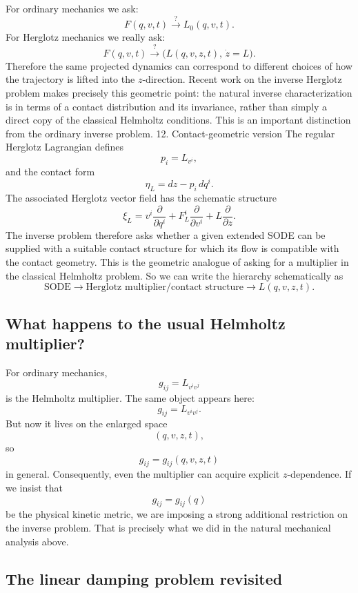 For ordinary mechanics we ask:
$$ F(q,v,t) \stackrel{?}{\longrightarrow} L_0(q,v,t). $$
For Herglotz mechanics we really ask:
$$ F(q,v,t) \stackrel{?}{\longrightarrow} \bigl(L(q,v,z,t),\,\dot z=L\bigr). $$
Therefore the same projected dynamics can correspond to different choices of how the trajectory is lifted into the \(z\)-direction.
Recent work on the inverse Herglotz problem makes precisely this geometric point: the natural inverse characterization is in terms of a contact distribution and its invariance, rather than simply a direct copy of the classical Helmholtz conditions.
This is an important distinction from the ordinary inverse problem.
12. Contact-geometric version
The regular Herglotz Lagrangian defines
$$ p_i=L_{v^i}, $$
and the contact form
\begin{equation}
 \eta_L=dz-p_i\,dq^i. \tag{40} 
\end{equation}
The associated Herglotz vector field has the schematic structure
\begin{equation}
 \xi_L = v^i\frac{\partial}{\partial q^i} + F_L^i\frac{\partial}{\partial v^i} + L\frac{\partial}{\partial z}. \tag{41} 
\end{equation}
The inverse problem therefore asks whether a given extended SODE can be supplied with a suitable contact structure for which its flow is compatible with the contact geometry. This is the geometric analogue of asking for a multiplier in the classical Helmholtz problem.
So we can write the hierarchy schematically as
$$ \boxed{ \text{SODE} \rightarrow \text{Herglotz multiplier/contact structure} \rightarrow L(q,v,z,t). } $$

\subsection{What happens to the usual Helmholtz multiplier?}

For ordinary mechanics,
$$ g_{ij}=L_{v^iv^j} $$
is the Helmholtz multiplier.
The same object appears here:
$$ \boxed{ g_{ij}=L_{v^iv^j}. } $$
But now it lives on the enlarged space
$$ (q,v,z,t), $$
so
$$ g_{ij}=g_{ij}(q,v,z,t) $$
in general.
Consequently, even the multiplier can acquire explicit \(z\)-dependence.
If we insist that
$$ g_{ij}=g_{ij}(q) $$
be the physical kinetic metric, we are imposing a strong additional restriction on the inverse problem.
That is precisely what we did in the natural mechanical analysis above.

\subsection{The linear damping problem revisited}

